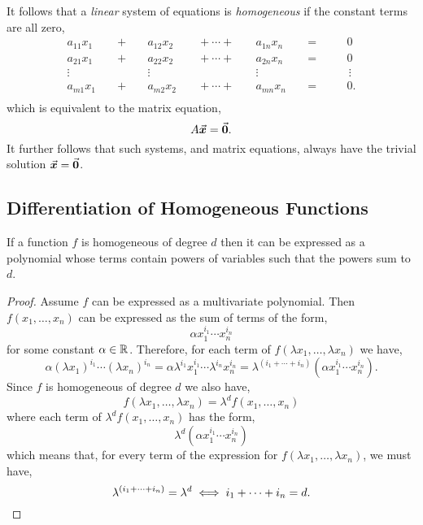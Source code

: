 \documentclass[../MathsNotesBase.tex]{subfiles}
\begin{document}
{		
		\biggerskip
		
		It follows that a \textit{linear} system of equations is \textit{homogeneous} if the constant terms are all zero,
		\[ 
			\begin{alignedat}
					{7}a_{11}x_{1}&&\;+\;&&a_{12}x_{2}&&\;+\cdots +\;&&a_{1n}x_{n}&&\;=\;&&&0\\a_{21}x_{1}&&\;+\;&&a_{22}x_{2}&&\;+\cdots +\;&&a_{2n}x_{n}&&\;=\;&&&0\\\vdots \;\;\;&&&&\vdots \;\;\;&&&&\vdots \;\;\;&&&&&\,\vdots \\a_{m1}x_{1}&&\;+\;&&a_{m2}x_{2}&&\;+\cdots +\;&&a_{mn}x_{n}&&\;=\;&&&0.\\
			\end{alignedat}
		\]
		which is equivalent to the matrix equation,
		\[ A \vec{\bm{x}} = \vec{\bm{0}}. \]
		It further follows that such systems, and matrix equations, always have the trivial solution ${ \vec{\bm{x}} = \vec{\bm{0}} }$.
		
		
		


		
		
		\pagebreak
		\subsection{Differentiation of Homogeneous Functions}
		\bigskip
		\begin{lemma}\label{lem:homogeneous-func-has-powers-that-sum-to-degree}
			If a function $f$ is homogeneous of degree $d$ then it can be expressed as a polynomial whose terms contain powers of variables such that the powers sum to $d$.
		\end{lemma}
		\begin{proof}
			Assume $f$ can be expressed as a multivariate polynomial. Then $f(x_1, \dots, x_n)$ can be expressed as the sum of terms of the form,
			\[ \alpha x_1^{i_1} \cdots x_n^{i_n} \]
			for some constant ${ \alpha \in \mathbb{R}^{} }$. Therefore, for each term of $f(\lambda x_1, \dots, \lambda x_n)$ we have,
			\[ \alpha (\lambda x_1)^{i_1} \cdots (\lambda x_n)^{i_n} = \alpha \lambda^{i_1} x_1^{i_1} \cdots \lambda^{i_n} x_n^{i_n} = \lambda^{(i_1 + \cdots + i_n)} (\alpha x_1^{i_1} \cdots x_n^{i_n}). \]
			Since $f$ is homogeneous of degree $d$ we also have,
			\[ f(\lambda x_1, \dots, \lambda x_n) = \lambda^d f(x_1,\dots, x_n) \]
			where each term of $\lambda^d f(x_1,\dots, x_n)$ has the form,
			\[ \lambda^d (\alpha x_1^{i_1} \cdots x_n^{i_n}) \]
			which means that, for every term of the expression for $f(\lambda x_1, \dots, \lambda x_n)$, we must have,
			\[ \lambda^{(i_1 + \cdots + i_n)} = \lambda^d \iff i_1 + \cdots + i_n = d. \qedhere \]
		\end{proof}
		
}
\end{document}
